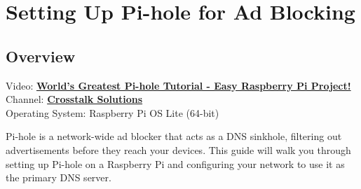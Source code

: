 \section{Setting Up Pi-hole for Ad Blocking}

\subsection{Overview}
Video: \href{https://www.youtube.com/watch?v=cE21YjuaB6o}{\textbf{\color{blue}World's Greatest Pi-hole Tutorial - Easy Raspberry Pi Project!}} \\
Channel: \href{https://www.youtube.com/@CrosstalkSolutions}{\textbf{\color{blue}Crosstalk Solutions}} \\
Operating System: Raspberry Pi OS Lite (64-bit)

Pi-hole is a network-wide ad blocker that acts as a DNS sinkhole, filtering out advertisements before they reach your devices. This guide will walk you through setting up Pi-hole on a Raspberry Pi and configuring your network to use it as the primary DNS server.

